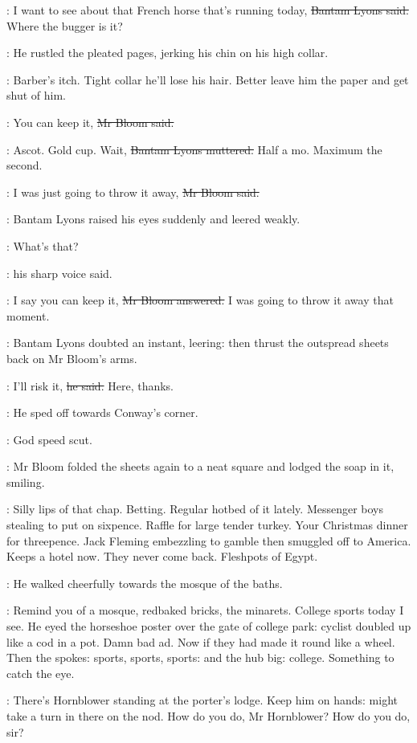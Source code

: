 \lyons:
I want to see about that French horse that's running today,
\sout{Bantam Lyons said.}
Where the bugger is it?

:
He rustled the pleated pages,
jerking his chin on his high collar.

\BloomInt:
Barber's itch.
Tight collar he'll lose his hair.
Better leave him the paper and get shut of him.

\Bloom:
You can keep it,
\sout{Mr Bloom said.}

\lyons:
Ascot.
Gold cup.
Wait,
\sout{Bantam Lyons muttered.}
Half a mo.
Maximum the second.

\Bloom:
I was just going to throw it away,
\sout{Mr Bloom said.}

:
Bantam Lyons raised his eyes suddenly and leered weakly.

\lyons:
What's that?

:
his sharp voice said.

\Bloom:
I say you can keep it,
\sout{Mr Bloom answered.}
I was going to throw it away that moment.

:
Bantam Lyons doubted an instant, leering:
then thrust the outspread sheets back on Mr Bloom's arms.

\lyons:
I'll risk it,
\sout{he said.}
Here, thanks.

:
He sped off towards Conway's corner.

\BloomInt:
God speed scut.

:
Mr Bloom folded the sheets again to a neat square
and lodged the soap in it,
smiling.

\BloomInt:
Silly lips of that chap.
Betting.
Regular hotbed of it lately.
Messenger boys stealing to put on sixpence.
Raffle for large tender turkey.
Your Christmas dinner for threepence.
Jack Fleming embezzling to gamble
then smuggled off to America.
Keeps a hotel now.
They never come back.
Fleshpots of Egypt.

:
He walked cheerfully towards the mosque of the baths.

\BloomInt:
Remind you of a mosque,
redbaked bricks, the minarets.
College sports today I see.
He eyed the horseshoe poster over the gate of college park:
cyclist doubled up like a cod in a pot.
Damn bad ad.
Now if they had made it round like a wheel.
Then the spokes:
sports, sports, sports: and the hub big:
college.
Something to catch the eye.

\BloomInt:
There's Hornblower standing at the porter's lodge.
Keep him on hands:
might take a turn in there on the nod.
How do you do, Mr Hornblower?
How do you do, sir?

